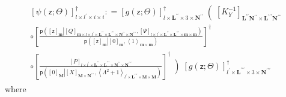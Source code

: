 \documentclass[preprint,12pt]{elsarticle}
\newcommand*{\M}[1]{\ensuremath{#1}\xspace}
\newcommand*{\x}{\times}
\newcommand*{\mi}[1]{\mathbf{#1}}
\newcommand*{\rv}[1]{\mathsf{#1}}
\newcommand*{\te}[2][]{\left\lbrack{#2}\right\rbrack_{#1}}
\newcommand*{\diag}[2][]{\left\langle{#2}\right\rangle_{#1}}
\newcommand*{\prob}[3]{\M{\mathsf{p}\!\left(\left.{#1}\right\vert{#2,#3}\right)}}
\newcommand*{\deq}{\M{\mathrel{\mathop:}=}}
\begin{document}
            \begin{multline*}
                \te[l\x l^{\prime}\x i\x i]{\psi(\rv{z}; \Theta)}^{\dagger}
                \deq  \left. \te[l\x\mi{L^{\prime\prime}}\x 3 \x\mi{N^{\prime\prime}}]{g({\rv{z}}; \Theta)}^{\dagger} \right(\te[\mi{L^{\prime\prime}N^{\prime\prime}}\x\mi{L^{\prime\prime\prime}N^{\prime\prime\prime}}]{K_{Y}^{-1}}\\
                \circ \te{\frac
                {\prob{\te[\mi{m}]{\rv{z}}}{\te[\mi{m}\x l\x l^{\prime}\x \mi{L^{\prime\prime}}\x \mi{L^{\prime\prime\prime}}\x \mi{N^{\prime\prime}}\x \mi{N^{\prime\prime\prime}}]{Q}}{\te[l\x l^{\prime}\x \mi{L^{\prime\prime}}\x \mi{L^{\prime\prime\prime}}\x\mi{m}\x\mi{m}]{\Psi}}}
                {\prob{\te[\mi{m}]{\rv{z}}}{\te[\mi{m}]{0}}{\diag[\mi{m}\x\mi{m}]{1}}}}^{\dagger} \\
                \circ \te{\frac
                {\te[l\x l^{\prime}\x \mi{L^{\prime\prime}}\x \mi{L^{\prime\prime\prime}}\x \mi{N^{\prime\prime}}\x \mi{N^{\prime\prime\prime}}]{P}}
                {\prob{\te[\mi{M}]{0}}{\te[\mi{M}\x\mi{N^{\prime\prime\prime}}]{X}}
                {\diag[l^{\prime}\x\mi{L^{\prime\prime\prime}}\x\mi{M}\x\mi{M}]{\Lambda^{2}+1}}}}^{\dagger}
                \left) 
                \te[l^{\prime}\x\mi{L^{\prime\prime\prime}}\x 3\x \mi{N^{\prime\prime\prime}}]{g({\rv{z}}; \Theta)}^{\dagger} \right.
            \end{multline*}
            where
\end{document}
